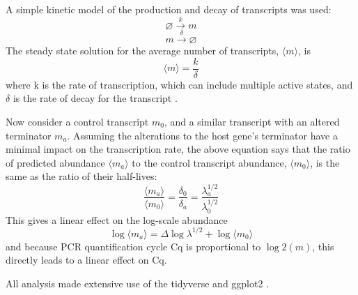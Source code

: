 \documentclass[../main.tex]{subfiles}
\begin{document}
A simple kinetic model of the production and decay of transcripts was used:
\[\varnothing \xrightarrow{k} m\]
\[m \xrightarrow{\delta}  \varnothing\]
The steady state solution for the average number of transcripts, \(\langle m \rangle\), is
\[\langle m \rangle = \frac{k}{\delta}\]
where k is the rate of transcription, which can include multiple active states, and \(\delta\) is the rate of decay for the transcript \parencite{Sanchez2008}.

Now consider a control transcript \(m_0\), and a similar transcript with an altered terminator \(m_a\). Assuming the alterations to the host gene's terminator have a minimal impact on the transcription rate, the above equation says that the ratio of predicted abundance \(\langle m_a \rangle\) to the control transcript abundance, \(\langle m_0 \rangle\), is the same as the ratio of their half-lives:
\[\frac{\langle m_a \rangle}{\langle m_0 \rangle} = \frac{\delta_0}{\delta_a} =\frac{\lambda^{1/2}_a}{\lambda^{1/2}_0}\]
This gives a linear effect on the log-scale abundance
\[\log\langle m_a \rangle =\Delta \log\lambda^{1/2} + \log\langle m_0 \rangle\]
and because PCR quantification cycle Cq is proportional to \(\log2(m)\), this directly leads to a linear effect on Cq.

All analysis made extensive use of the tidyverse and ggplot2 \parencite{Wickham2016, Wickham2019}.
\end{document}
